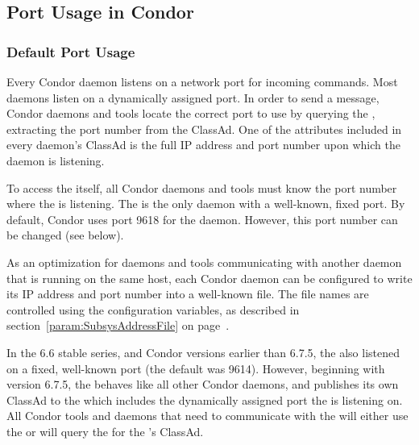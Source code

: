 \subsection{\label{sec:Port-Details}Port Usage in Condor}



\subsubsection{\label{sec:Ports-Standard}Default Port Usage}

Every Condor daemon listens on a network port for incoming commands.
Most daemons listen on a dynamically assigned port.
In order to send a message,
Condor daemons and tools locate the correct port to use
by querying the ,
extracting the port number from the ClassAd.
One of the attributes included in every daemon's ClassAd is the full
IP address and port number upon which the daemon is listening.

To access the  itself,
all Condor daemons and tools
must know the port number  where the  is listening.
The  is the only daemon with a well-known,
fixed port.
By default, Condor uses port 9618 for the  daemon.
However, this port number can be changed (see below).

As an optimization for daemons and tools communicating with another
daemon that is running on the same host,
each Condor daemon can be configured to
write its IP address and port number into a well-known file.
The file names are controlled using the 
configuration variables,
as described in section~\ref{param:SubsysAddressFile} on
page~\pageref{param:SubsysAddressFile}. 

\Note In the 6.6 stable series, and Condor versions earlier than
6.7.5, the  also listened on a fixed, well-known
port (the default was 9614).
However, beginning with version 6.7.5, the  behaves
like all other Condor daemons, and publishes its own ClassAd to the
 which includes the dynamically assigned port 
the  is listening on.
All Condor tools and daemons that need to communicate with the
 will either use the
 or will query the
 for the 's ClassAd.

